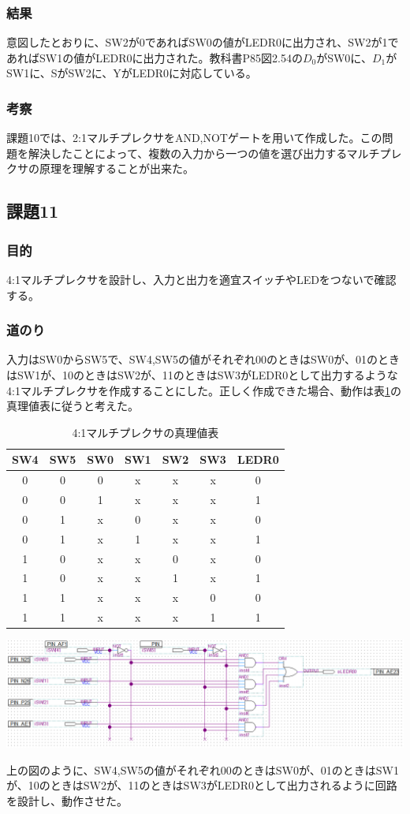 \documentclass[a4paper]{jarticle}
\begin{document}
\subsubsection{結果}
意図したとおりに、SW2が0であればSW0の値がLEDR0に出力され、SW2が1であればSW1の値がLEDR0に出力された。教科書P85図2.54の$D_0$がSW0に、$D_1$がSW1に、SがSW2に、YがLEDR0に対応している。
\subsubsection{考察}
課題10では、2:1マルチプレクサをAND,NOTゲートを用いて作成した。この問題を解決したことによって、複数の入力から一つの値を選び出力するマルチプレクサの原理を理解することが出来た。
\subsection{課題11}
\subsubsection{目的}
4:1マルチプレクサを設計し、入力と出力を適宜スイッチやLEDをつないで確認する。
\subsubsection{道のり}
入力はSW0からSW5で、SW4,SW5の値がそれぞれ00のときはSW0が、01のときはSW1が、10のときはSW2が、11のときはSW3がLEDR0として出力するような4:1マルチプレクサを作成することにした。正しく作成できた場合、動作は表\ref{Report11Multiplexer}の真理値表に従うと考えた。
\begin{table}[ht]
	\begin{center}
		\caption{4:1マルチプレクサの真理値表}
		\label{Report11Multiplexer}
		\begin{tabular}{|c|c|c|c|c|c|c|}					\hline
			SW4	&SW5	&SW0	&SW1	&SW2	&SW3	&LEDR0\\	\hline\hline
			0	&0	&0	&x	&x	&x	&0\\		\hline
			0	&0	&1	&x	&x	&x	&1\\		\hline
			0	&1	&x	&0	&x	&x	&0\\		\hline
			0	&1	&x	&1	&x	&x	&1\\		\hline
			1	&0	&x	&x	&0	&x	&0\\		\hline
			1	&0	&x	&x	&1	&x	&1\\		\hline
			1	&1	&x	&x	&x	&0	&0\\		\hline
			1	&1	&x	&x	&x	&1	&1\\		\hline
		\end{tabular}
	\end{center}
\end{table}
\begin{center}
	\includegraphics[width=15cm]{work11.PNG}
\end{center}
上の図のように、SW4,SW5の値がそれぞれ00のときはSW0が、01のときはSW1が、10のときはSW2が、11のときはSW3がLEDR0として出力されるように回路を設計し、動作させた。
\end{document}
